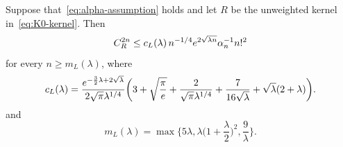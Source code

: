 \documentclass{mcom-l}
\numberwithin{equation}{section}
\numberwithin{theorem}{section} %
\begin{document}
\begin{lemma} \label{lemma:CK-2n-bound}
  Suppose that~\eqref{eq:alpha-assumption} holds and let $R$ be the unweighted kernel in~\eqref{eq:K0-kernel}.
  Then
  \begin{equation*}
    C_{R}^{2n} \leq c_L(\lambda) \, n^{-1/4} e^{2\sqrt{\smash[b]{\lambda n}}} \alpha_n^{-1} n!^2
  \end{equation*}
  for every $n \geq m_L(\lambda)$, where
  \begin{equation} \label{eq:cL-constant}
    c_L(\lambda) = \frac{e^{-\frac{3}{2} \lambda + 2\sqrt{\smash[b]{\lambda}}}}{2\sqrt{\pi} \lambda^{1/4}} \bigg( 3 + \sqrt{\frac{\pi}{e}} + \frac{2}{\sqrt{\pi} \lambda^{1/4}} + \frac{7}{16 \sqrt{\lambda}} + \sqrt{\lambda} (2 + \lambda) \bigg).
  \end{equation}
  and
  \begin{equation} \label{eq:mL-constant}
    m_L(\lambda) = \max\bigg\{ 5\lambda, \lambda\bigg(1+\frac{\lambda}{2} \bigg)^2, \frac{9}{\lambda} \bigg\}.
  \end{equation}
\end{lemma}
\end{document}
